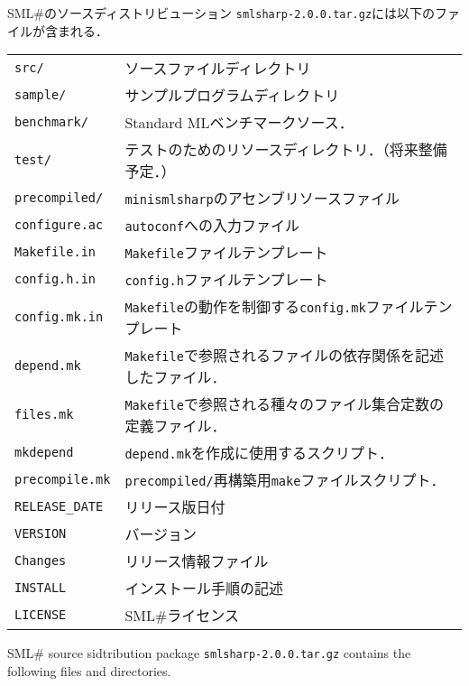 \documentclass{jbook}
\newif\ifjp
\newcommand{\smlsharp}{SML\#}
\newcommand{\code}[1]{\mbox{\large\tt #1}}
\begin{document}
\ifjp%
	\smlsharp{}のソースディストリビューション
\code{smlsharp-2.0.0.tar.gz}には以下のファイルが含まれる．

\begin{tabular}{ll}
\code{src/} &  ソースファイルディレクトリ\\
\code{sample/}& サンプルプログラムディレクトリ\\
\code{benchmark/}& Standard MLベンチマークソース．\\
\code{test/}& テストのためのリソースディレクトリ．（将来整備予定．）\\
\code{precompiled/}& \code{minismlsharp}のアセンブリソースファイル\\
\code{configure.ac}& \code{autoconf}への入力ファイル\\
\code{Makefile.in}& \code{Makefile}ファイルテンプレート\\
\code{config.h.in}& \code{config.h}ファイルテンプレート\\
\code{config.mk.in}& \code{Makefile}の動作を制御する\code{config.mk}ファイルテンプレート\\
\code{depend.mk}& \code{Makefile}で参照されるファイルの依存関係を記述したファイル．\\
\code{files.mk}& \code{Makefile}で参照される種々のファイル集合定数の定義ファイル．\\
\code{mkdepend}& \code{depend.mk}を作成に使用するスクリプト．\\
\code{precompile.mk}& \code{precompiled/}再構築用\code{make}ファイルスクリプト．\\
\code{RELEASE\_DATE} & リリース版日付\\
\code{VERSION} & バージョン\\
\code{Changes} & リリース情報ファイル\\
\code{INSTALL} & インストール手順の記述\\
\code{LICENSE} & \smlsharp{}ライセンス
\end{tabular}
\else%
	\smlsharp{} source sidtribution package 
\code{smlsharp-2.0.0.tar.gz} contains the following files and
directories.
\end{document}
